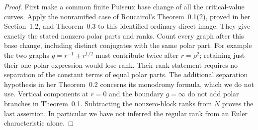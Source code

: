 \documentclass[11pt]{article}
\theoremstyle{definition}\newtheorem{definition}[theorem]{Definition}
\theoremstyle{remark}\newtheorem{remark}[theorem]{Remark}
\begin{document}
\begin{proof}
First make a common finite Puiseux base change of all the
critical-value curves. Apply the nonramified case of Roucairol's
Theorem~0.1(2), proved in her Section~1.2, and Theorem~0.3
\cite{RoucairolFormal} to this identified ordinary direct image.
They give exactly the stated nonzero polar parts and ranks.
Count every graph after this base change, including distinct
conjugates with the same polar part. For example the two graphs
$g=r^{-1}\pm r^{1/2}$ must contribute twice after $r=\rho^2$;
retaining just their one polar expression would lose rank.
Their rank statement requires no separation of the constant terms
of equal polar parts. The additional separation hypothesis in her
Theorem~0.2 concerns its monodromy formula, which we do not use.
Vertical components at $r=0$ and the boundary $g=\infty$ do not
add polar branches in Theorem~0.1. Subtracting the nonzero-block
ranks from $N$ proves the last assertion. In particular we have
not inferred the regular rank from an Euler characteristic alone.
\end{proof}
\end{document}

